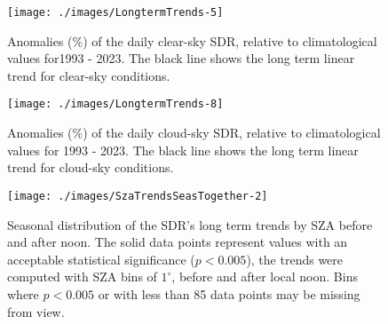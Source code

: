 \appendix


\begin{figure}[h!]

{\centering \texttt{[image: ./images/LongtermTrends-5]}

}

\caption{Anomalies (\%) of the daily clear-sky SDR, relative to climatological values for1993 - 2023. The black line shows the long term linear trend for clear-sky conditions.}\label{fig:trendCLEAR}
\end{figure}

\begin{figure}[h!]

{\centering \texttt{[image: ./images/LongtermTrends-8]}

}

\caption{Anomalies (\%) of the daily cloud-sky SDR, relative to climatological values for 1993 - 2023. The black line shows the long term linear trend for cloud-sky conditions.}\label{fig:trendCLOUD}
\end{figure}

\begin{figure}[h!]

{\centering \texttt{[image: ./images/SzaTrendsSeasTogether-2]}

}

\caption{Seasonal distribution of the SDR's long term trends by SZA before and after noon. The solid data points represent values with an acceptable statistical significance ($p<0.005$), the trends were computed with SZA bins of $1^\circ$, before and after local noon. Bins where $p<0.005$ or with less than 85 data points may be missing from view.}\label{fig:SZAtrendSeason}
\end{figure}


